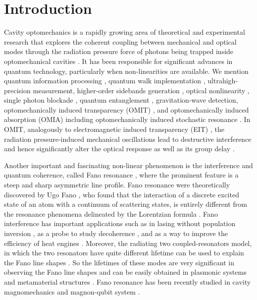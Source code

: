 \documentclass[aps,pra,superscriptaddress,balancelastpage,twocolumn]{revtex4}
\begin{document}
\maketitle




\section{Introduction}
Cavity optomechanics is a rapidly growing area of theoretical and
experimental research that explores the coherent coupling between mechanical
and optical modes through the radiation pressure force of photons being
trapped inside optomechanical cavities \cite{Mey}. It has been responsible
for significant advances in quantum technology, particularly when
non-linearities are available. We mention quantum information processing
\cite{Fio}, quantum walk implementation \cite{Jalil}, ultrahigh-precision
measurement\cite{Teu,AliM}, higher-order sidebands generation \cite{Qian},
optical nonlinearity \cite{Lud}, single photon blockade \cite{SS1,SS2},
quantum entanglement \cite{AM0,MYP,SKS,BTT}, gravitation-wave detection\cite%
{Arva,AliM2}, optomechanically induced transparency (OMIT) \cite{MYPOM1,OM1,OM2}, and
optomechanically induced absorption (OMIA) \cite{MYPOM2} including
optomechanically induced stochastic resonance \cite{Faraz}. In OMIT, analogously to electromagnetic
induced transparency (EIT) \cite{Imam}, the radiation pressure-induced
mechanical oscillations lead to destructive interference and hence
significantly alter the optical response as well as its group delay \cite%
{Saif,Saiff}.

Another important and fascinating non-linear phenomenon is the interference and quantum coherence, called Fano resonance \cite{Yuri}, where the prominent feature is a steep and sharp asymmetric line profile. Fano resonance were theoretically discovered by Ugo Fano \cite{Fano}, who found that the interaction of a discrete excited state of an
atom with a continuum of scattering states, is entirely different from the resonance phenomena delineated by the Lorentzian formula \cite{Fano}. Fano interference has important applications such as in lasing without population inversion \cite{Gav}, as a probe to study decoherence \cite{Kuh}, and as a way to improve the efficiency of heat engines \cite{Chap}. Moreover, the
radiating two coupled-resonators model, in which the two resonators have quite different lifetime can be used to explain the Fano line shapes \cite{Tass,Alim2}. So the lifetimes of these modes are very significant in observing the Fano line shapes \cite{Gal} and can be easily obtained in plasmonic systems \cite{Gall} and metamaterial structures \cite{Ali,AliM5}. Fano resonance has been recently studied in cavity magnomechanics \cite{Kamran} and magnon-qubit system \cite{Sabur}.
\end{document}
